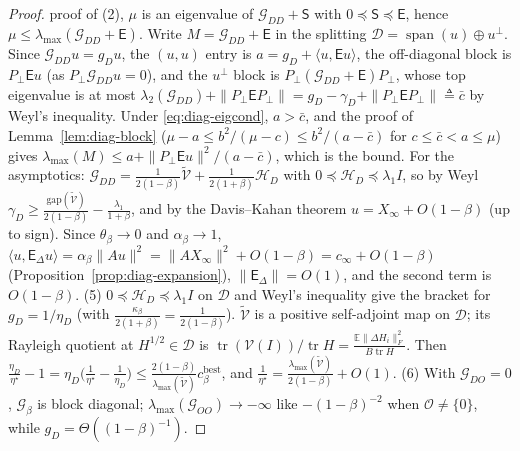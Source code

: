 \documentclass[11pt]{article}
\theoremstyle{remark}
\newcommand{\E}{\mathbb{E}}
\newcommand{\tr}{\operatorname{tr}}
\begin{document}
\begin{proof}
proof of (2), $\mu$ is an eigenvalue of $\mathcal G_{DD}+\mathsf S$ with $0\preceq\mathsf S\preceq\mathsf E$, hence $\mu\le\lambda_{\max}(\mathcal G_{DD}+\mathsf E)$. Write $M=\mathcal G_{DD}+\mathsf E$ in the splitting $\mathcal D=\operatorname{span}(u)\oplus u^\perp$. Since $\mathcal G_{DD}u=g_Du$, the $(u,u)$ entry is $a=g_D+\langle u,\mathsf Eu\rangle$, the off-diagonal block is $P_\perp\mathsf Eu$ (as $P_\perp\mathcal G_{DD}u=0$), and the $u^\perp$ block is $P_\perp(\mathcal G_{DD}+\mathsf E)P_\perp$, whose top eigenvalue is at most $\lambda_2(\mathcal G_{DD})+\|P_\perp\mathsf EP_\perp\|=g_D-\gamma_D+\|P_\perp\mathsf EP_\perp\|\triangleq\bar c$ by Weyl's inequality. Under \eqref{eq:diag-eigcond}, $a>\bar c$, and the proof of Lemma~\ref{lem:diag-block} ($\mu-a\le b^2/(\mu-c)\le b^2/(a-\bar c)$ for $c\le\bar c<a\le\mu$) gives $\lambda_{\max}(M)\le a+\|P_\perp\mathsf Eu\|^2/(a-\bar c)$, which is the bound. For the asymptotics: $\mathcal G_{DD}=\frac{1}{2(1-\beta)}\widetilde{\mathcal V}+\frac{1}{2(1+\beta)}\mathcal H_D$ with $0\preceq\mathcal H_D\preceq\lambda_1I$, so by Weyl $\gamma_D\ge\frac{\mathrm{gap}(\widetilde{\mathcal V})}{2(1-\beta)}-\frac{\lambda_1}{1+\beta}$, and by the Davis--Kahan theorem $u=X_\infty+O(1-\beta)$ (up to sign). Since $\theta_\beta\to0$ and $\alpha_\beta\to1$, $\langle u,\mathsf E_\Delta u\rangle=\alpha_\beta\|Au\|^2=\|AX_\infty\|^2+O(1-\beta)=c_\infty+O(1-\beta)$ (Proposition~\ref{prop:diag-expansion}), $\|\mathsf E_\Delta\|=O(1)$, and the second term is $O(1-\beta)$. (5) $0\preceq\mathcal H_D\preceq\lambda_1I$ on $\mathcal D$ and Weyl's inequality give the bracket for $g_D=1/\eta_D$ (with $\frac{\kappa_\beta}{2(1+\beta)}=\frac1{2(1-\beta)}$). $\widetilde{\mathcal V}$ is a positive self-adjoint map on $\mathcal D$; its Rayleigh quotient at $H^{1/2}\in\mathcal D$ is $\tr(\mathcal V(I))/\tr H=\frac{\E\|\Delta H_i\|_F^2}{B\tr H}$. Then $\frac{\eta_D}{\eta^\star}-1=\eta_D\big(\frac1{\eta^\star}-\frac1{\eta_D}\big)\le\frac{2(1-\beta)}{\lambda_{\max}(\widetilde{\mathcal V})}c^{\mathrm{best}}_\beta$, and $\frac1{\eta^\star}=\frac{\lambda_{\max}(\widetilde{\mathcal V})}{2(1-\beta)}+O(1)$. (6) With $\mathcal G_{DO}=0$, $\mathcal G_\beta$ is block diagonal; $\lambda_{\max}(\mathcal G_{OO})\to-\infty$ like $-(1-\beta)^{-2}$ when $\mathcal O\ne\{0\}$, while $g_D=\Theta((1-\beta)^{-1})$.
\end{proof}
\end{document}
